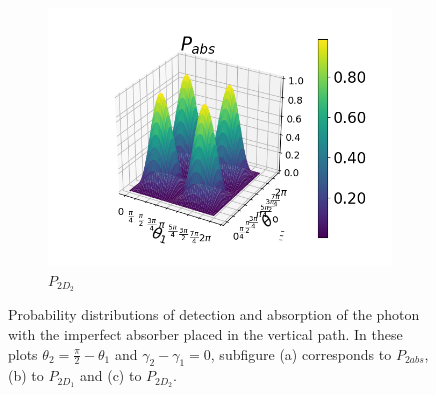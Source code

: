 \documentclass[12pt]{book}
\begin{document}
\begin{figure}[t!]
\begin{subfigure}[b]{0.4\linewidth}
\includegraphics[width=\linewidth]{images/PAbs_BS_v.png}
\caption{$P_{2D_{2}}$}
\label{fig:BS2}
\end{subfigure}
\caption{Probability distributions of detection and absorption of the photon with the imperfect absorber placed in the vertical path. In these plots $\theta_{2}=\frac{\pi}{2}-\theta_{1}$ and $\gamma_{2}-\gamma_{1}=0$, subfigure (a) corresponds to $P_{2abs}$, (b) to $P_{2D_{1}}$ and (c) to $P_{2D_{2}}$.}
\label{P_bs_constraint}
\end{figure}
\end{document}
